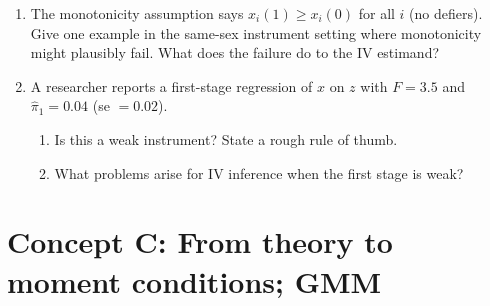 \documentclass{article}
\begin{document}
\begin{enumerate}[label=\textbf{B.\arabic*},leftmargin=*,itemsep=10pt]
\item  The monotonicity assumption says $x_i(1) \geq x_i(0)$ for all $i$ (no defiers).  Give one example in the same-sex instrument setting where monotonicity might plausibly fail.  What does the failure do to the IV estimand?

\item  A researcher reports a first-stage regression of $x$ on $z$ with $F = 3.5$ and $\hat\pi_1 = 0.04$ (se $=0.02$).
\begin{enumerate}[label=(\alph*)]
  \item Is this a weak instrument?  State a rough rule of thumb.
  \item What problems arise for IV inference when the first stage is weak?
\end{enumerate}

\end{enumerate}

\bigskip

\section*{Concept C: From theory to moment conditions; GMM}
\end{document}
